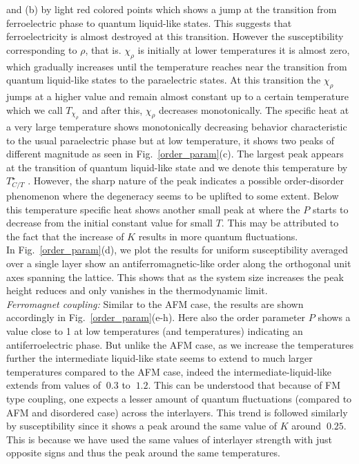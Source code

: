and (b) by light red colored points which shows a jump at the transition from ferroelectric phase to quantum liquid-like states. This suggests that ferroelectricity is almost destroyed at this transition. However the susceptibility corresponding to $\rho$, that is. $\chi_\rho$ is initially at lower temperatures it is almost zero, which gradually increases until the temperature reaches near the transition from quantum liquid-like states to the paraelectric states. At this transition the $\chi_\rho$ jumps at a higher value and remain almost constant up to a certain temperature which we call $T_{\chi_\rho}$ and after this, $\chi_\rho$ decreases monotonically. The specific heat at a very large temperature shows monotonically decreasing behavior characteristic to the usual paraelectric phase but at low temperature, it shows two peaks of different magnitude as seen in Fig.~\ref{order_param}(c). The largest peak appears at the transition of quantum liquid-like state and we denote this temperature by $T^\star_{C/T}$
. However, the sharp nature of the peak indicates a possible order-disorder phenomenon where the degeneracy seems to be uplifted to some extent. Below this
temperature specific heat shows another small peak at where the $P$ starts to decrease from the initial constant value for small $T$.   This may be
attributed to the fact that the increase of $K$ results in more quantum fluctuations. \\
\indent  In Fig.~\ref{order_param}(d), we plot the results for uniform susceptibility averaged over a single layer show an antiferromagnetic-like order along the orthogonal unit axes spanning the lattice. This shows that as the system size increases the peak height reduces and only vanishes in the thermodynamic limit.     \\
\indent \textit{Ferromagnet coupling:} Similar to the AFM case, the results are shown accordingly in Fig.~\ref{order_param}(e-h). Here also the order parameter $P$ shows a value close to 1 at low temperatures (and temperatures) indicating an antiferroelectric phase. But unlike the AFM case, as we increase the temperatures further the intermediate liquid-like state seems to extend to much larger temperatures compared to the AFM case, indeed the intermediate-liquid-like extends from values of $~0.3$ to $~1.2$. This can be understood that because of FM type coupling, one expects a lesser amount of quantum fluctuations (compared to AFM and disordered case) across the interlayers. This trend is followed similarly by susceptibility since it shows a peak around the same value of $K$ around $~0.25$. This is because we have used the same values of interlayer strength with just opposite signs and thus the peak around the same temperatures. \\
